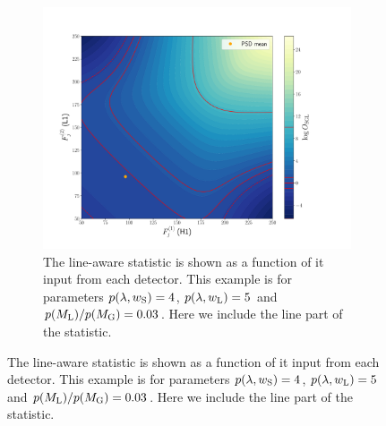 \begin{figure}
\begin{subfigure}[h]{\linewidth}
\begin{minipage}{0.65\linewidth}
\includegraphics[width=0.9\columnwidth]{C3_soap/lookup_linesmall.pdf}
\end{minipage}\hfill
\begin{minipage}{0.35\linewidth}
\caption{The line-aware statistic is shown as a function of it input from each detector. This example is for parameters $p(\lambda,w_{\rm{S}}) = 4$, $p(\lambda,w_{\rm{L}}) = 5$ and $p(M_{\rm{L}})/p(M_{\rm{G}}) = 0.03$. Here we include the line part of the statistic.}
\label{soap:las:detp:linesmall}
\end{minipage}
\end{subfigure}


\end{figure}
